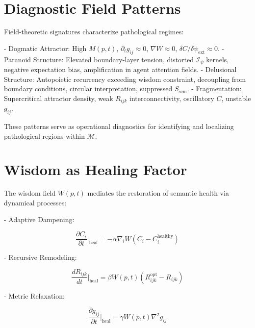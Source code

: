 
\section{Diagnostic Field Patterns}
\label{sec:diagnostic_field_patterns}

Field-theoretic signatures characterize pathological regimes:

- Dogmatic Attractor: High $M(p,t)$, $\partial_t g_{ij} \approx 0$, $\nabla W \approx 0$, $\delta C / \delta \psi_{\text{ext}} \approx 0$.
- Paranoid Structure: Elevated boundary-layer tension, distorted $\mathcal{I}_{\psi}$ kernels, negative expectation bias, amplification in agent attention fields.
- Delusional Structure: Autopoietic recurrency exceeding wisdom constraint, decoupling from boundary conditions, circular interpretation, suppressed $S_{\text{sem}}$.
- Fragmentation: Supercritical attractor density, weak $R_{ijk}$ interconnectivity, oscillatory $C$, unstable $g_{ij}$.

These patterns serve as operational diagnostics for identifying and localizing pathological regions within $\mathcal{M}$.


\section{Wisdom as Healing Factor}
\label{sec:wisdom_as_healing_factor}

The wisdom field $W(p,t)$ mediates the restoration of semantic health via dynamical processes:

- Adaptive Dampening:

\begin{equation}
\frac{\partial C_i}{\partial t}\bigg|_{\text{heal}} = -\alpha \nabla_i W (C_i - C_i^{\text{healthy}})
\end{equation}

- Recursive Remodeling:

\begin{equation}
\frac{dR_{ijk}}{dt}\bigg|_{\text{heal}} = \beta W(p,t) (R_{ijk}^{\text{opt}} - R_{ijk})
\end{equation}

- Metric Relaxation:

\begin{equation}
\frac{\partial g_{ij}}{\partial t}\bigg|_{\text{heal}} = \gamma W(p,t) \nabla^2 g_{ij}
\end{equation}

